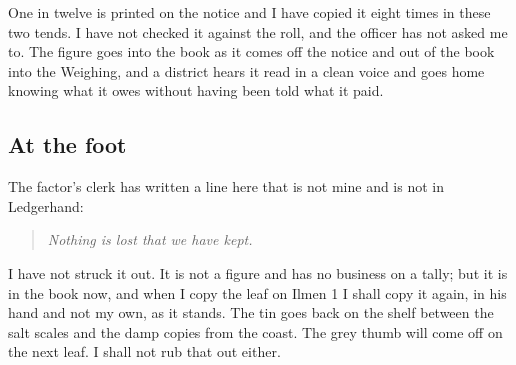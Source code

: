 \documentclass{design/chronicle}
\begin{document}
One in twelve is printed on the notice and I have copied it eight times in these two tends. I have not checked it against the roll, and the officer has not asked me to. The figure goes into the book as it comes off the notice and out of the book into the Weighing, and a district hears it read in a clean voice and goes home knowing what it owes without having been told what it paid.

\subsection*{At the foot}

The factor’s clerk has written a line here that is not mine and is not in Ledgerhand:

\begin{quote}\itshape Nothing is lost that we have kept.\end{quote}

I have not struck it out. It is not a figure and has no business on a tally; but it is in the book now, and when I copy the leaf on Ilmen 1 I shall copy it again, in his hand and not my own, as it stands. The tin goes back on the shelf between the salt scales and the damp copies from the coast. The grey thumb will come off on the next leaf. I shall not rub that out either.
\end{document}
